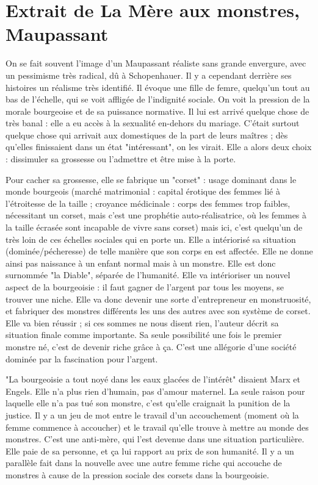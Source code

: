 \documentclass[a4paper,12pt]{book}
\begin{document}
\section{Extrait de La Mère aux monstres, Maupassant}
On se fait souvent l'image d'un Maupassant réaliste sans grande envergure, avec un pessimisme très radical, dû à Schopenhauer. Il y a cependant derrière ses histoires un réalisme très identifié. Il évoque une fille de femre, quelqu'un tout au bas de l'échelle, qui se voit affligée de l'indignité sociale. On voit la pression de la morale bourgeoise et de sa puissance normative. Il lui est arrivé quelque chose de très banal : elle a eu accès à la sexualité en-dehors du mariage. C'était surtout quelque chose qui arrivait aux domestiques de la part de leurs maîtres ; dès qu'elles finissaient dans un état "intéressant", on les virait. Elle a alors deux choix : dissimuler sa grossesse ou l'admettre et être mise à la porte.
\par Pour cacher sa grossesse, elle se fabrique un "corset" : usage dominant dans le monde bourgeois (marché matrimonial : capital érotique des femmes lié à l'étroitesse de la taille ; croyance médicinale : corps des femmes trop faibles, nécessitant un corset, mais c'est une prophétie auto-réalisatrice, où les femmes à la taille écrasée sont incapable de vivre sans corset) mais ici, c'est quelqu'un de très loin de ces échelles sociales qui en porte un. Elle a intériorisé sa situation (dominée/pécheresse) de telle manière que son corps en est affectée. Elle ne donne ainsi pas naissance à un enfant normal mais à un monstre. Elle est donc surnommée "la Diable", séparée de l'humanité. Elle va intérioriser un nouvel aspect de la bourgeoisie : il faut gagner de l'argent par tous les moyens, se trouver une niche. Elle va donc devenir une sorte d'entrepreneur en monstruosité, et fabriquer des monstres différents les uns des autres avec son système de corset. Elle va bien réussir ; si ces sommes ne nous disent rien, l'auteur décrit sa situation finale comme importante. Sa seule possibilité une fois le premier monstre né, c'est de devenir riche grâce à ça. C'est une allégorie d'une société dominée par la fascination pour l'argent.
\par "La bourgeoisie a tout noyé dans les eaux glacées de l'intérêt" disaient Marx et Engels. Elle n'a plus rien d'humain, pas d'amour maternel. La seule raison pour laquelle elle n'a pas tué son monstre, c'est qu'elle craignait la punition de la justice. Il y a un jeu de mot entre le travail d'un accouchement (moment où la femme commence à accoucher) et le travail qu'elle trouve à mettre au monde des monstres. C'est une anti-mère, qui l'est devenue dans une situation particulière. Elle paie de sa personne, et ça lui rapport au prix de son humanité. Il y a un parallèle fait dans la nouvelle avec une autre femme riche qui accouche de monstres à cause de la pression sociale des corsets dans la bourgeoisie.
\end{document}
